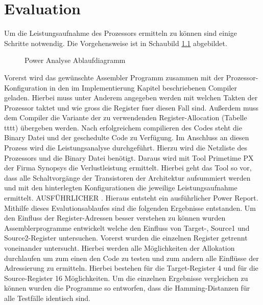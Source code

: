 \chapter{Evaluation}
\label{chap:evaluation}
Um die Leistungsaufnahme des Prozessors ermitteln zu können sind einige Schritte notwendig. Die Vorgehensweise ist in Schaubild \ref{fig:flow_power_analyse} abgebildet.

\begin{scriptsize}
	\begin{figure}[htbp] 
		\centering
		
		\caption{Power Analyse Ablaufdiagramm}
		\label{fig:flow_power_analyse}
	\end{figure}
\end{scriptsize}

Vorerst wird das gewünschte Assembler Programm zusammen mit der Prozessor-Konfiguration in den im Implementierung Kapitel beschriebenen Compiler geladen. Hierbei muss unter Anderem angegeben werden mit welchen Takten der Prozessor taktet und wie gross die Register fuer diesen Fall sind. Außerdem muss dem Compiler die Variante der zu verwendenden Register-Allocation (Tabelle tttt) übergeben werden. Nach erfolgreichem compilieren des Codes steht die Binary Datei und der geschedulte Code zu Verfügung. Im Anschluss an diesen Prozess wird die Leistungsanalyse durchgeführt. Hierzu wird die Netzliste des Prozessors und die Binary Datei benötigt. Daraus wird mit Tool Primetime PX der Firma Synopsys die Verlustleistung ermittelt. Hierbei geht das Tool so vor, dass alle Schaltvorgänge der Transistoren der Architektur aufsummiert werden und mit den hinterlegten Konfigurationen die jeweilige Leistungsaufnahme ermittelt. AUSFÜHRLICHER . Hieraus entsteht ein ausführlicher Power Report. 
Mithilfe dieses Evalutionsablaufes sind die folgenden Ergebnisse entstanden.
Um den Einfluss der Register-Adressen besser verstehen zu können wurden Assemblerprogramme entwickelt welche den Einfluss von Target-, Source1 und Source2-Register untersuchen. Vorerst wurden die einzelnen Register getrennt voneinander untersucht. Hierbei werden alle Möglichkeiten der Allokation durchlaufen um zum einen den Code zu testen und zum andern alle Einflüsse der Adressierung zu ermitteln. Hierbei bestehen für die Target-Register 4 und für die Source-Register 16 Möglichkeiten. Um die einzelnen Ergebnisse vergleichen zu können wurden die Programme so entworfen, dass die Hamming-Distanzen für alle Testfälle identisch sind. 

